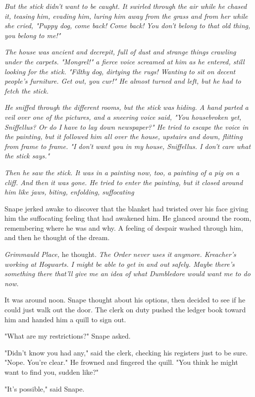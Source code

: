 \emph{But the stick didn't want to be caught. It swirled through the air while he chased it, teasing him, evading him, luring him away from the grass and from her while she cried, "Puppy dog, come back! Come back! You don't belong to that old thing, you belong to me!"}

\emph{The house was ancient and decrepit, full of dust and strange things crawling under the carpets. "Mongrel!" a fierce voice screamed at him as he entered, still looking for the stick. "Filthy dog, dirtying the rugs! Wanting to sit on decent people's furniture. Get out, you cur!" He almost turned and left, but he had to fetch the stick.}

\emph{He sniffed through the different rooms, but the stick was hiding. A hand parted a veil over one of the pictures, and a sneering voice said, "You housebroken yet, Sniffellus? Or do I have to lay down newspaper?" He tried to escape the voice in the painting, but it followed him all over the house, upstairs and down, flitting from frame to frame. "I don't want you in my house, Sniffellus. I don't care what the stick says."}

\emph{Then he saw the stick. It was in a painting now, too, a painting of a pig on a cliff. And then it was gone. He tried to enter the painting, but it closed around him like jaws, biting, enfolding, suffocating{\el}}

Snape jerked awake to discover that the blanket had twisted over his face giving him the suffocating feeling that had awakened him. He glanced around the room, remembering where he was and why. A feeling of despair washed through him, and then he thought of the dream.

\emph{Grimmauld Place,} he thought. \emph{The Order never uses it anymore. Kreacher's working at Hogwarts. I might be able to get in and out safely. Maybe there's something there that'll give me an idea of what Dumbledore would want me to do now.}

It was around noon. Snape thought about his options, then decided to see if he could just walk out the door. The clerk on duty pushed the ledger book toward him and handed him a quill to sign out.

"What are my restrictions?" Snape asked.

"Didn't know you had any," said the clerk, checking his registers just to be sure. "Nope. You're clear." He frowned and fingered the quill. "You think he might want to find you, sudden like?"

"It's possible," said Snape.

